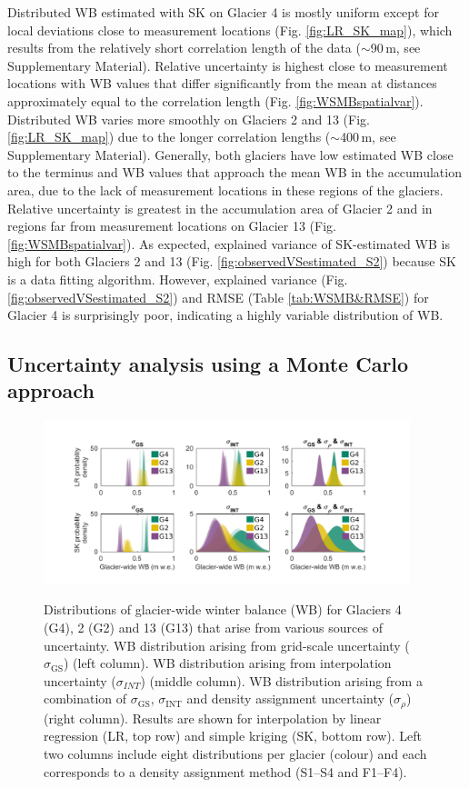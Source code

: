 \documentclass[twocolumn, letterpaper]{igs}
\begin{document}
Distributed WB estimated with SK on Glacier 4 is mostly uniform except for local deviations close to measurement locations (Fig. \ref{fig:LR_SK_map}), which results from the relatively short correlation length of the data ($\sim$90\,m, see Supplementary Material). Relative uncertainty is highest close to measurement locations with WB values that differ significantly from the mean at distances approximately equal to the correlation length (Fig. \ref{fig:WSMBspatialvar}).
Distributed WB varies more smoothly on Glaciers 2 and 13 (Fig. \ref{fig:LR_SK_map}) due to the longer correlation lengths ($\sim$400\,m, see Supplementary Material). Generally, both glaciers have low estimated WB close to the terminus and WB values that approach the mean WB in the accumulation area, due to the lack of measurement locations in these regions of the glaciers. Relative uncertainty is greatest in the accumulation area of Glacier 2 and in regions far from measurement locations on Glacier 13 (Fig. \ref{fig:WSMBspatialvar}). 
As expected, explained variance of SK-estimated WB is high for both Glaciers 2 and 13 (Fig. \ref{fig:observedVSestimated_S2}) because SK is a data fitting algorithm. However, explained variance (Fig. \ref{fig:observedVSestimated_S2}) and RMSE (Table \ref{tab:WSMB&RMSE}) for Glacier 4 is surprisingly poor, indicating a highly variable distribution of WB.


\subsection{Uncertainty analysis using a Monte Carlo approach}

\begin{figure}
	\centering
	\includegraphics[width =0.95\textwidth]{WSMBDist.pdf}\\
	\caption{Distributions of glacier-wide winter balance (WB) for Glaciers 4 (G4), 2 (G2) and 13 (G13) that arise from various sources of uncertainty. WB distribution arising from grid-scale uncertainty ($\sigma_{\mathrm{GS}}$) (left column). WB distribution arising from interpolation uncertainty ($\sigma_{INT}$) (middle column). WB distribution arising from a combination of $\sigma_{\mathrm{GS}}$, $\sigma_{\mathrm{INT}}$ and density assignment uncertainty ($\sigma_{\rho}$) (right column). Results are shown for interpolation by linear regression (LR, top row) and simple kriging (SK, bottom row). Left two columns include eight distributions per glacier (colour) and each corresponds to a density assignment method (S1--S4 and F1--F4).}
	\label{fig:WSMBDist_LR}
\end{figure}
\end{document}
